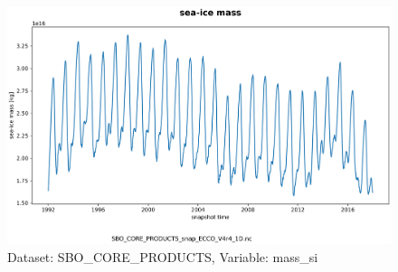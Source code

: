 \begin{figure}[H]
\centering
\includegraphics[scale=0.55]{../images/plots/v4r4/oneD_plots/SBO_Core_Products/mass_si.png}
\caption{Dataset: SBO\_CORE\_PRODUCTS, Variable: mass\_si}
\label{tab:table-SBO_CORE_PRODUCTS_mass_si-Plot}
\end{figure}
\newpage
\pagebreak
